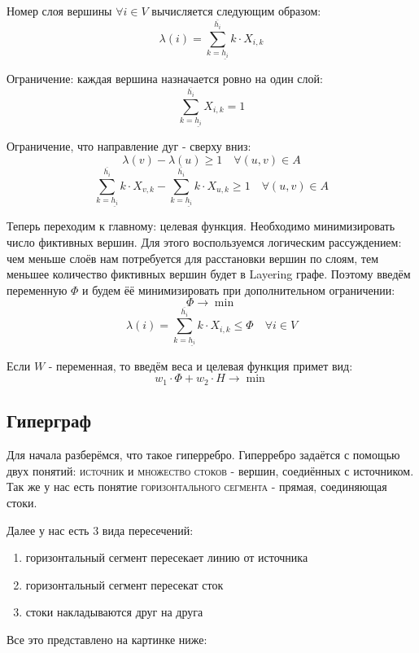 \documentclass[%
10pt, %
final, %
oneside, %
onecolumn, %
centertags]{article} %
\theoremstyle{plain}
\theoremstyle{definition}
\theoremstyle{remark}
\begin{document}
Номер слоя вершины $\forall i \in V$ вычисляется следующим образом:
$$\lambda(i) = \sum\limits_{k = \underline{h_i}}^{\overline{h_i}} k \cdot X_{i, k}$$

Ограничение: каждая вершина назначается ровно на один слой:
$$\sum\limits_{k = \underline{h_i}}^{\overline{h_i}} X_{i, k} = 1$$

Ограничение, что направление дуг - сверху вниз:
$$\lambda(v) - \lambda(u) \geqslant 1 \quad \forall (u,v) \in A$$
$$\sum\limits_{k = \underline{h_i}}^{\overline{h_i}} k \cdot X_{v, k} - \sum\limits_{k = \underline{h_i}}^{\overline{h_i}} k \cdot X_{u, k} \geqslant 1 \quad \forall (u,v) \in A$$

Теперь переходим к главному: целевая функция. Необходимо минимизировать число фиктивных вершин. Для этого воспользуемся логическим рассуждением: чем меньше слоёв нам потребуется для расстановки вершин по слоям, тем меньшее количество фиктивных вершин будет в Layering графе. Поэтому введём переменную $\Phi$ и будем ёё минимизировать при дополнительном ограничении:
$$\Phi \to \min$$
$$\lambda(i) = \sum\limits_{k = \underline{h_i}}^{\overline{h_i}} k \cdot X_{i, k} \leqslant \Phi \quad \forall i \in V$$

Если $W$ - переменная, то введём веса и целевая функция примет вид:
$$w_1 \cdot \Phi + w_2 \cdot H \to \min$$

\newpage
\subsection{Гиперграф}

Для начала разберёмся, что такое гиперребро. Гиперребро задаётся с помощью двух понятий: \textsc{источник} и \textsc{множество стоков} - вершин, соедиённых с источником. Так же у нас есть понятие \textsc{горизонтального сегмента} - прямая, соединяющая стоки.

Далее у нас есть $3$ вида пересечений:

\begin{enumerate}
	\item горизонтальный сегмент пересекает линию от источника
	\item горизонтальный сегмент пересекат сток
	\item стоки накладываются друг на друга
\end{enumerate}

Все это представлено на картинке ниже:
\end{document}
